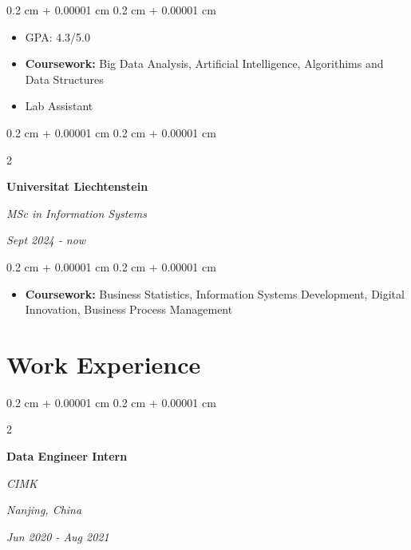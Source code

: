 \documentclass[10pt, letterpaper]{article}
\newenvironment{highlights}{
    \begin{itemize}[
        topsep=0.10 cm,
        parsep=0.10 cm,
        partopsep=0pt,
        itemsep=0pt,
        leftmargin=0.4 cm + 10pt
    ]
}{
    \end{itemize}
} %
\newenvironment{onecolentry}{
    \begin{adjustwidth}{
        0.2 cm + 0.00001 cm
    }{
        0.2 cm + 0.00001 cm
    }
}{
    \end{adjustwidth}
} %
\newenvironment{twocolentry}[2][]{
    \onecolentry
    \def\secondColumn{#2}
    \setcolumnwidth{\fill, 4.5 cm}
    \begin{paracol}{2}
}{
    \switchcolumn \raggedleft \secondColumn
    \end{paracol}
    \endonecolentry
} %
\begin{document}
        \vspace{0.10 cm}
        \begin{onecolentry}
            \begin{highlights}
                \item GPA: 4.3/5.0
                \item \textbf{Coursework:} Big Data Analysis, Artificial Intelligence, Algorithims and Data Structures
                \item Lab Assistant
            \end{highlights}
        \end{onecolentry}
        \vspace{0.50 cm}

        
        \begin{twocolentry}{
        
        
            \textit{Sept 2024 - now}}
                \textbf{Universitat Liechtenstein}
    
                \textit{MSc in Information Systems}
            \end{twocolentry}
    
            \vspace{0.10 cm}
            \begin{onecolentry}
                \begin{highlights}
                    \item \textbf{Coursework:} Business Statistics, Information Systems Development, Digital Innovation, Business Process Management
                \end{highlights}
            \end{onecolentry}
            \vspace{0.50 cm}
    

    \section{Work Experience}


    \vspace{0.5 cm}

        \begin{twocolentry}{
        \textit{Nanjing, China}    
            
        \textit{Jun 2020 - Aug 2021}}
            \textbf{Data Engineer Intern}
            
            \textit{CIMK}
        \end{twocolentry}
\end{document}
